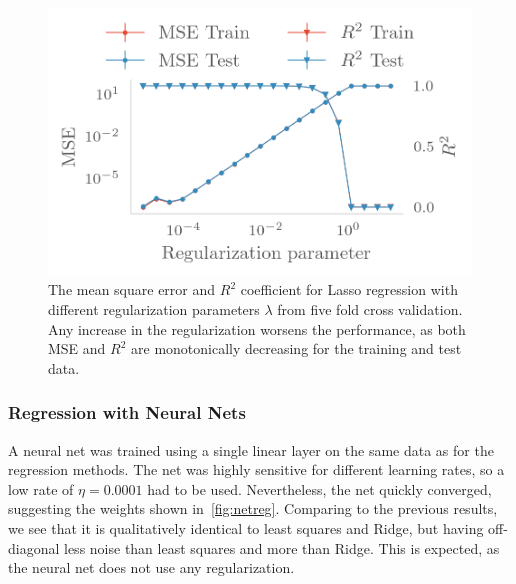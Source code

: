 \begin{figure}[H]
  \centering
  \includegraphics[]{figures/lasso_reg.png}
  \caption{\label{fig:lasso_reg} The mean square error and \(R^{2}\) coefficient
    for Lasso regression with different regularization parameters \(\lambda\)
    from five fold cross validation.
    Any increase in the regularization worsens the performance, as both MSE and
    \(R^{2}\) are monotonically decreasing for the training and test data.}
\end{figure}

\subsubsection{Regression with Neural Nets}

A neural net was trained using a single linear layer on the same data as for the
regression methods. The net was highly sensitive for different learning rates,
so a low rate of \(\eta = 0.0001\) had to be used. Nevertheless, the net quickly
converged, suggesting the weights shown in~\cref{fig:netreg}. Comparing to the
previous results, we see that it is qualitatively identical to least squares and
Ridge, but having off-diagonal less noise than least squares and more than
Ridge. This is expected, as the neural net does not use any regularization.

